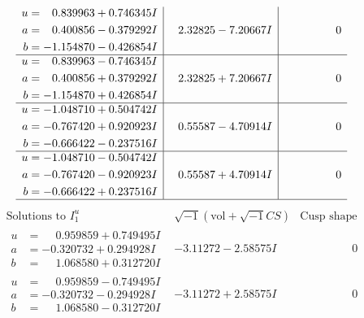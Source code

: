 \documentclass[1p]{elsarticle_modified}
\theoremstyle{definition}
\newcommand{\I}{\sqrt{-1}}
\begin{document}
$$\begin{array}{c|c|c}
\begin{aligned}
u &= \phantom{-}0.839963 + 0.746345 I \\
a &= \phantom{-}0.400856 - 0.379292 I \\
b &= -1.154870 - 0.426854 I\end{aligned}
 & \phantom{-}2.32825 - 7.20667 I & \phantom{-0.000000 } 0 \\ \hline\begin{aligned}
u &= \phantom{-}0.839963 - 0.746345 I \\
a &= \phantom{-}0.400856 + 0.379292 I \\
b &= -1.154870 + 0.426854 I\end{aligned}
 & \phantom{-}2.32825 + 7.20667 I & \phantom{-0.000000 } 0 \\ \hline\begin{aligned}
u &= -1.048710 + 0.504742 I \\
a &= -0.767420 + 0.920923 I \\
b &= -0.666422 - 0.237516 I\end{aligned}
 & \phantom{-}0.55587 - 4.70914 I & \phantom{-0.000000 } 0 \\ \hline\begin{aligned}
u &= -1.048710 - 0.504742 I \\
a &= -0.767420 - 0.920923 I \\
b &= -0.666422 + 0.237516 I\end{aligned}
 & \phantom{-}0.55587 + 4.70914 I & \phantom{-0.000000 } 0\\
 \hline 
 \end{array}$$\newpage$$\begin{array}{c|c|c}  
\text{Solutions to }I^u_{1}& \I (\text{vol} + \sqrt{-1}CS) & \text{Cusp shape}\\
 \hline 
\begin{aligned}
u &= \phantom{-}0.959859 + 0.749495 I \\
a &= -0.320732 + 0.294928 I \\
b &= \phantom{-}1.068580 + 0.312720 I\end{aligned}
 & -3.11272 - 2.58575 I & \phantom{-0.000000 } 0 \\ \hline\begin{aligned}
u &= \phantom{-}0.959859 - 0.749495 I \\
a &= -0.320732 - 0.294928 I \\
b &= \phantom{-}1.068580 - 0.312720 I\end{aligned}
 & -3.11272 + 2.58575 I & \phantom{-0.000000 } 0 \\ \hline\begin{aligned}

\end{aligned}
\end{array}$$
\end{document}
